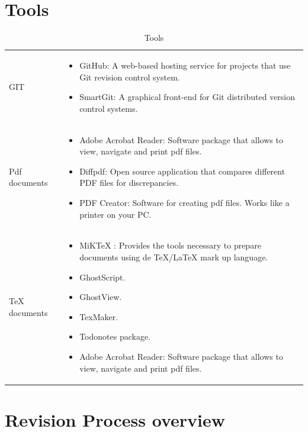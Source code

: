 \documentclass{template/openetcs_article}
\begin{document}
\section{Tools}
\begin{table}[H]
\begin{tabular}{|m{3cm}|m{11cm}|}
\hline
\rowcolor{myblue}
\multicolumn{2}{|c|}{Tools} \\\hline
GIT &
\begin{itemize}
\item GitHub: A web-based hosting service for projects that use Git revision control system.
\item SmartGit: A graphical front-end for Git distributed version control systems. 
\end{itemize}\\\hline
Pdf documents &
\begin{itemize}
\item Adobe Acrobat Reader: Software package that allows to view, navigate and print pdf files.
\item Diffpdf: Open source application that compares different PDF files for discrepancies. 
\item {PDF Creator: Software for creating pdf files. Works like a printer on your PC.}
\end{itemize}\\\hline
TeX documents &
\begin{itemize}
\item MiKTeX : Provides the tools necessary to prepare documents using de TeX/LaTeX mark up language.
\item GhostScript. 
\item GhostView.
\item TexMaker.
\item Todonotes package.
\item Adobe Acrobat Reader: Software package that allows to view, navigate and print pdf files.
\end{itemize}
\\\hline
\end{tabular}
\caption{Tools}
\end{table}

\section{Revision Process overview}
\end{document}
